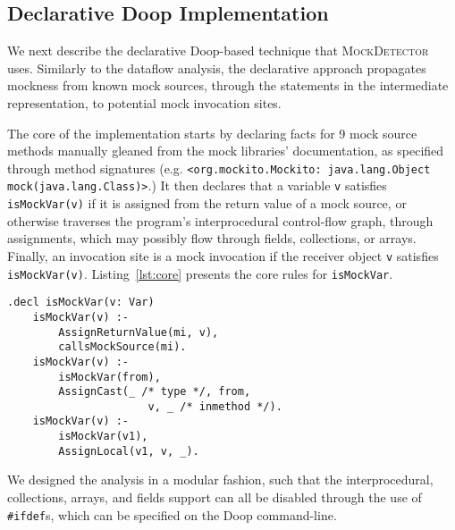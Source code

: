 \subsection{Declarative Doop Implementation}
We next describe the declarative Doop-based technique that \textsc{MockDetector} uses. Similarly to the dataflow analysis, the declarative approach propagates mockness from known mock sources, through the statements in the intermediate representation, to potential mock invocation sites.

The core of the implementation starts by declaring facts for 9 mock source methods manually gleaned from the mock libraries' documentation, as specified through method signatures (e.g. 
\texttt{<org.mockito.Mockito: java.lang.Object mock(java.lang.Class)>}.)
It then declares that a variable {\tt v} satisfies \verb+isMockVar(v)+ if it is assigned from the return value of a mock source, or otherwise traverses the program's interprocedural control-flow graph, through assignments, which may possibly flow through fields, collections, or arrays. Finally, an invocation site is a mock invocation if the receiver object {\tt v} satisfies \verb+isMockVar(v)+. Listing~\ref{lst:core} presents the core rules for {\tt isMockVar}.

\begin{lstlisting}[basicstyle=\ttfamily\small,numbers=none,label={lst:core},caption={Core rules for propagating mockness via predicate {\tt isMockVar}.}]
    .decl isMockVar(v: Var)
    isMockVar(v) :-
        AssignReturnValue(mi, v),
        callsMockSource(mi).
    isMockVar(v) :-
        isMockVar(from),
        AssignCast(_ /* type */, from,
                      v, _ /* inmethod */).
    isMockVar(v) :-
        isMockVar(v1),
        AssignLocal(v1, v, _).
\end{lstlisting}

We designed the analysis in a modular fashion, such that the interprocedural, collections, arrays, and fields support can all be disabled through the use of \verb+#ifdef+s, which can be specified on the Doop command-line.

